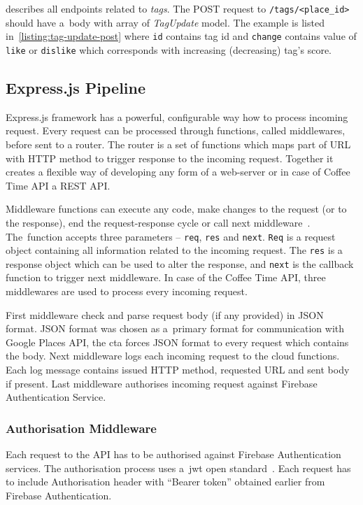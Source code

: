  describes all endpoints related to \textit{tags}. The POST request to \verb|/tags/<place_id>| should have a~body with array of \textit{TagUpdate} model. The example is listed in~\cref{listing:tag-update-post} where \verb|id| contains tag id and \verb|change| contains value of \verb|like| or \verb|dislike| which corresponds with increasing (decreasing) tag's score. 
\subsection{Express.js Pipeline}
Express.js framework has a powerful, configurable way how to process incoming request. Every request can be processed through functions, called middlewares, before sent to a router. The router is a set of functions which maps part of URL with HTTP method to trigger response to the incoming request. Together it creates a flexible way of developing any form of a web-server or in case of Coffee Time API a REST API. 

Middleware functions can execute any code, make changes to the request (or to the response), end the request-response cycle or call next middleware~\cite{express-js-middleware}. The~function accepts three parameters -- \verb|req|, \verb|res| and \verb|next|. \verb|Req| is a request object containing all information related to the incoming request. The \verb|res| is a response object which can be used to alter the response, and \verb|next| is the callback function to trigger next middleware. In case of the Coffee Time API, three middlewares are used to process every incoming request.

First middleware check and parse request body (if any provided) in JSON format. JSON format was chosen as a~primary format for communication with Google Places API, the \gls{cta} forces JSON format to every request which contains the body. Next middleware logs each incoming request to the cloud functions. Each log message contains issued HTTP method, requested URL and sent body if present. Last middleware authorises incoming request against Firebase Authentication Service.

\subsubsection{Authorisation Middleware}
Each request to the API has to be authorised against Firebase Authentication services. The authorisation process uses a~\gls{jwt} open standard~\cite{jwt-intro}. Each request has to include Authorisation header with ``Bearer token'' obtained earlier from Firebase Authentication. 

